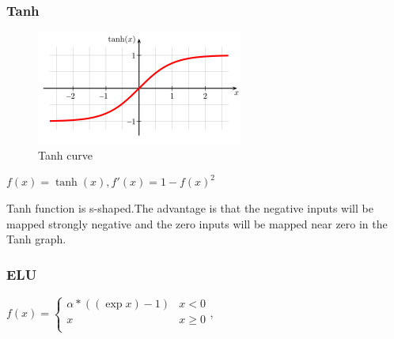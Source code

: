 \documentclass[11pt,a4paper]{article}
\begin{document}
\subsubsection{Tanh}
\begin{figure}[htb]
\begin{center}
\includegraphics[width=\columnwidth]{Hyperbolic_Tangent.png}
\end{center}
\caption{Tanh curve}
\label{fig:figure5}
\end{figure}
$f(x) = \tanh(x), f'(x) = 1-f(x)^2$

Tanh function is s-shaped.The advantage is that the negative inputs will be mapped strongly negative and the zero inputs will be mapped near zero in the Tanh graph.

\subsubsection{ELU}

$f(x)= \begin{cases}
      \alpha*((\exp{x})-1) & x < 0 \\
      x & x\geq 0 \\
   \end{cases},$
\end{document}
